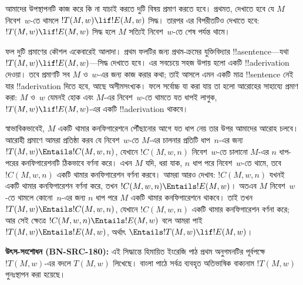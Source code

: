 \documentclass[../../../include/open-logic-section]{subfiles}
\begin{document}

\begin{explain}
আমাদের উপস্থাপনটি কাজ করে কি না যাচাই করতে দুটি বিষয় প্রমাণ করতে হবে।
প্রথমত, দেখাতে হবে যে $M$ নিবেশ~$w$-তে থামলে $!T(M,w)\lif !E(M,w)$ সিদ্ধ।
তারপর এর বিপরীতটিও দেখাতে হবে: $!T(M,w)\lif !E(M,w)$ সিদ্ধ হলে $M$ সত্যিই
নিবেশ~$w$-তে শেষ পর্যন্ত থামে।

ফল দুটি প্রমাণের কৌশল একেবারেই আলাদা। প্রথম ফলটির জন্য প্রথম-ক্রমের
যুক্তিবিদ্যার !!a{sentence}—যথা $!T(M,w)\lif !E(M,w)$—সিদ্ধ দেখাতে হবে।
এর সবচেয়ে সহজ উপায় হলো একটি !!a{derivation} দেওয়া। তবে প্রমাণটি সব
$M$ ও~$w$-এর জন্য কাজ করার কথা; তাই আসলে এমন একটি মাত্র !!{sentence} নেই
যার !!a{derivation} দিতে হবে, আছে অসীমসংখ্যক। ফলে সর্বোচ্চ যা করা যায় তা
হলো আরোহের সাহায্যে প্রমাণ করা: $M$ ও~$w$ যেমনই হোক এবং $M$-এর
নিবেশ~$w$-তে থামতে যত ধাপই লাগুক, $!T(M,w)\lif !E(M,w)$-এর একটি
!!a{derivation} থাকবে।

স্বাভাবিকভাবেই, $M$ একটি থামার কনফিগারেশনে পৌঁছানোর আগে যত ধাপ নেয় তার
উপর আমাদের আরোহ চলবে। আরোহী প্রমাণে আমরা প্রতিষ্ঠা করব যে নিবেশ~$w$-তে
$M$-এর চালনার প্রতিটি ধাপ~$n$-এর জন্য
$!T(M,w)\Entails !C(M,w,n)$, যেখানে $!C(M,w,n)$ নিবেশ~$w$-তে চালানো
$M$-এর $n$ ধাপ-পরের কনফিগারেশনটি ঠিকভাবে বর্ণনা করে। এখন $M$ যদি,
ধরা যাক, $n$ ধাপ পরে নিবেশ~$w$-তে থামে, তবে $!C(M,w,n)$ একটি থামার
কনফিগারেশন বর্ণনা করবে। আমরা আরও দেখাব: $!C(M,w,n)$ যখনই একটি থামার
কনফিগারেশন বর্ণনা করে, তখন $!C(M,w,n)\Entails !E(M,w)$। অতএব $M$
নিবেশ~$w$-তে থামলে কোনো~$n$-এর জন্য $n$ ধাপ পরে $M$ একটি থামার
কনফিগারেশনে থাকবে। তাই তখন $!T(M,w)\Entails !C(M,w,n)$, যেখানে
$!C(M,w,n)$ একটি থামার কনফিগারেশন বর্ণনা করে; আর সেই ক্ষেত্রে
$!C(M,w,n)\Entails !E(M,w)$ বলে আমরা পাই
$!T(M,w)\Entails !E(M,w)$, অর্থাৎ
$\Entails !T(M,w)\lif !E(M,w)$।
\par\smallskip\noindent\textnormal{\small\textbf{উৎস-সংশোধন (BN-SRC-180):} এই সিদ্ধান্তে হিমায়িত ইংরেজি পাঠ প্রথম অনুগমনটির পূর্বপক্ষে $!T(M,w)$-এর বদলে $T(M,w)$ লিখেছে। বাংলা পাঠে সর্বত্র ব্যবহৃত অতিভাষিক বাক্যনাম $!T(M,w)$ পুনঃস্থাপন করা হয়েছে।} %


\end{explain}
\end{document}
